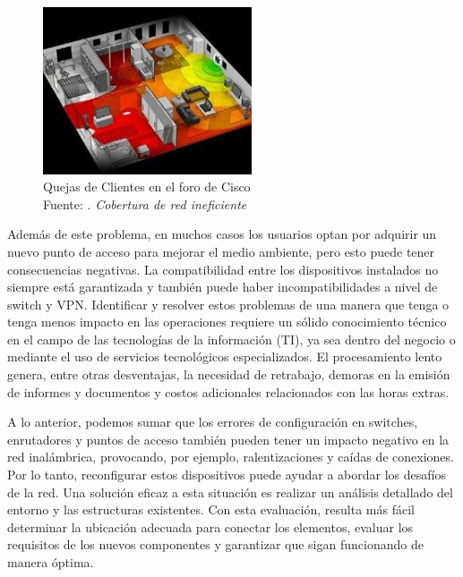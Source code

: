 \begin{figure}[h]
	\begin{center}
		\includegraphics[width=0.55\textwidth]{1/figures/CISCO_QUEJAS.jpg}
		\caption[Quejas de Clientes en el foro de Cisco]{Quejas de Clientes en el foro de Cisco\\
		Fuente: \cite{ot_cisco2022ap}. \textit{Cobertura de red ineficiente}}
		\label{1:fig1}
	\end{center}
\end{figure}

Además de este problema, en muchos casos los usuarios optan por adquirir un nuevo punto de acceso para mejorar el medio ambiente, pero esto puede tener consecuencias negativas. La compatibilidad entre los dispositivos instalados no siempre está garantizada y también puede haber incompatibilidades a nivel de switch y VPN. Identificar y resolver estos problemas de una manera que tenga o tenga menos impacto en las operaciones requiere un sólido conocimiento técnico en el campo de las tecnologías de la información (TI), ya sea dentro del negocio o mediante el uso de servicios tecnológicos especializados. El procesamiento lento genera, entre otras desventajas, la necesidad de retrabajo, demoras en la emisión de informes y documentos y costos adicionales relacionados con las horas extras.  \cite{ot_napit2017ap}

A lo anterior, podemos sumar que los errores de configuración en switches, enrutadores y puntos de acceso también pueden tener un impacto negativo en la red inalámbrica, provocando, por ejemplo, ralentizaciones y caídas de conexiones. Por lo tanto, reconfigurar estos dispositivos puede ayudar a abordar los desafíos de la red. Una solución eficaz a esta situación es realizar un análisis detallado del entorno y las estructuras existentes. Con esta evaluación, resulta más fácil determinar la ubicación adecuada para conectar los elementos, evaluar los requisitos de los nuevos componentes y garantizar que sigan funcionando de manera óptima.  \cite{ot_napit2017ap}

